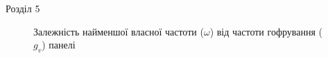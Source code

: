 \documentclass[8pt]{beamer}
\numberwithin{figure}{section}
\numberwithin{equation}{section}
\numberwithin{table}{section}
\begin{document}
\begin{frame}{Розділ 5}
\begin{figure}[h]
\begin{minipage}[h]{0.49\linewidth}
\end{minipage}
\hfill
\begin{minipage}[h]{0.49\linewidth}
\end{minipage}
\caption{Залежність найменшої власної частоти ($\omega$) від частоти гофрування ($g_v$) панелі}
\end{figure}
\end{frame}
\end{document}
